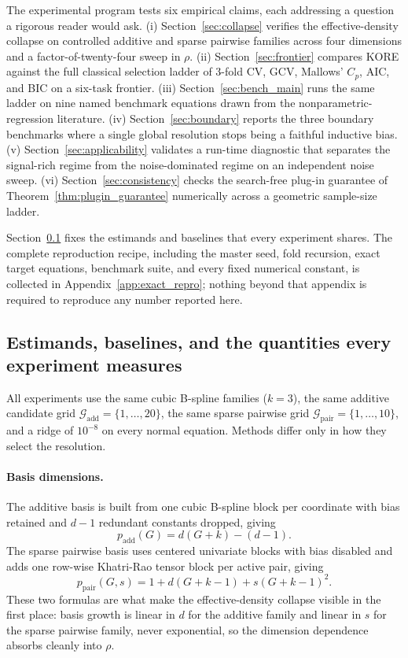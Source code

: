 \documentclass{article}
\newcommand{\KORE}{\textsc{KORE}}
\newcommand{\add}{\mathrm{add}}
\newcommand{\pair}{\mathrm{pair}}
\begin{document}
The experimental program tests six empirical claims, each addressing a question a rigorous reader would ask. (i) Section~\ref{sec:collapse} verifies the effective-density collapse on controlled additive and sparse pairwise families across four dimensions and a factor-of-twenty-four sweep in $\rho$. (ii) Section~\ref{sec:frontier} compares \KORE{} against the full classical selection ladder of $3$-fold CV, GCV, Mallows' $C_p$, AIC, and BIC on a six-task frontier. (iii) Section~\ref{sec:bench_main} runs the same ladder on nine named benchmark equations drawn from the nonparametric-regression literature. (iv) Section~\ref{sec:boundary} reports the three boundary benchmarks where a single global resolution stops being a faithful inductive bias. (v) Section~\ref{sec:applicability} validates a run-time diagnostic that separates the signal-rich regime from the noise-dominated regime on an independent noise sweep. (vi) Section~\ref{sec:consistency} checks the search-free plug-in guarantee of Theorem~\ref{thm:plugin_guarantee} numerically across a geometric sample-size ladder.

Section~\ref{sec:protocol} fixes the estimands and baselines that every experiment shares. The complete reproduction recipe, including the master seed, fold recursion, exact target equations, benchmark suite, and every fixed numerical constant, is collected in Appendix~\ref{app:exact_repro}; nothing beyond that appendix is required to reproduce any number reported here.

\subsection{Estimands, baselines, and the quantities every experiment measures}
\label{sec:protocol}

All experiments use the same cubic B-spline families ($k=3$), the same additive candidate grid $\mathcal{G}_{\add}=\{1,\dots,20\}$, the same sparse pairwise grid $\mathcal{G}_{\pair}=\{1,\dots,10\}$, and a ridge of $10^{-8}$ on every normal equation. Methods differ only in how they select the resolution.

\paragraph{Basis dimensions.}
The additive basis is built from one cubic B-spline block per coordinate with bias retained and $d-1$ redundant constants dropped, giving
\begin{equation}
    p_{\add}(G) = d(G+k) - (d-1).
    \label{eq:p_add}
\end{equation}
The sparse pairwise basis uses centered univariate blocks with bias disabled and adds one row-wise Khatri-Rao tensor block per active pair, giving
\begin{equation}
    p_{\pair}(G,s) = 1 + d(G+k-1) + s(G+k-1)^2.
    \label{eq:p_pair}
\end{equation}
These two formulas are what make the effective-density collapse visible in the first place: basis growth is linear in $d$ for the additive family and linear in $s$ for the sparse pairwise family, never exponential, so the dimension dependence absorbs cleanly into $\rho$.
\end{document}
